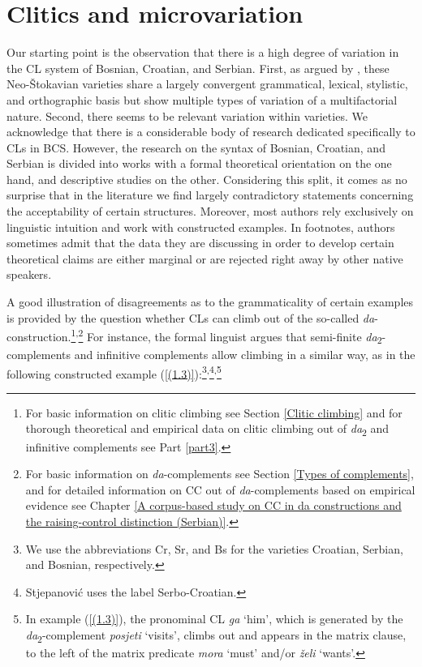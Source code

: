 \section{Clitics and microvariation}
\label{Clitics and microvariation}
Our starting point is the observation that there is a high degree of variation in the CL system of Bosnian, Croatian, and Serbian. First, as argued by \citet{WaldenfelsEder16}, these Neo-Štokavian varieties share a largely convergent grammatical, lexical, stylistic, and orthographic basis but show multiple types of variation of a multifactorial nature. Second, there seems to be relevant variation within varieties. We acknowledge that there is a considerable body of research dedicated specifically to CLs in BCS. However, the research on the syntax of Bosnian, Croatian, and Serbian is divided into works with a formal theoretical orientation on the one hand, and descriptive studies on the other. Considering this split, it comes as no surprise that in the literature we find largely contradictory statements concerning the acceptability of certain structures. Moreover, most authors rely exclusively on linguistic intuition and work with constructed examples. In footnotes, authors sometimes admit that the data they are discussing in order to develop certain theoretical claims are either marginal or are rejected right away by other native speakers. 

A good illustration of disagreements as to the grammaticality of certain examples is provided by the question whether CLs can climb out of the so-called \textit{da}-construction.\footnote{For basic information on clitic climbing see Section \ref{Clitic climbing} and for thorough theoretical and empirical data on clitic climbing out of \textit{da}\textsubscript{2} and infinitive complements see Part \ref{part3}.}\textsuperscript{,}\footnote{For basic information on \textit{da}-complements see Section \ref{Types of complements}, and for detailed information on CC out of \textit{da}-complements based on empirical evidence see Chapter \ref{A corpus-based study on CC in da constructions and the raising-control  distinction (Serbian)}.} For instance, the formal linguist \citet[174, 197]{Stjepanovic04} argues that semi-finite \textit{da}\textsubscript{2}-complements and infinitive complements allow climbing in a similar way, as in the following constructed example (\ref{(1.3)}):\footnote{We use the abbreviations Cr, Sr, and Bs for the varieties Croatian, Serbian, and Bosnian, respectively.}\textsuperscript{,}\footnote{Stjepanović uses the label Serbo-Croatian.}\textsuperscript{,}\footnote{In example (\ref{(1.3)}), the pronominal CL \textit{ga} `him', which is generated by the \textit{da}\textsubscript{2}-complement \textit{posjeti} `visits', climbs out and appears in the matrix clause, to the left of the matrix predicate \textit{mora} `must' and/or \textit{želi} `wants'.}

